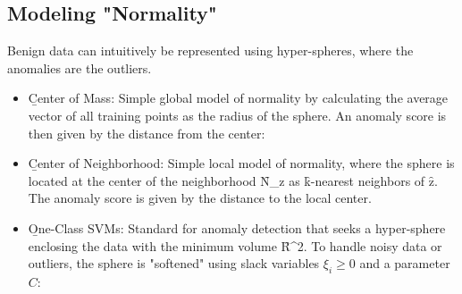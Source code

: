 \subsection{Modeling "Normality"}
Benign data can intuitively be represented using hyper-spheres, where the anomalies are the outliers.
\begin{itemize}
    \item \b{Center of Mass}: Simple global model of normality by calculating the average vector of all training points as the radius of the sphere. An anomaly score is then given by the distance from the center:
    \item \b{Center of Neighborhood}: Simple local model of normality, where the sphere is located at the center of the neighborhood \f{N_z} as \f{k}-nearest neighbors of \f{z}. The anomaly score is given by the distance to the local center.
    \item \b{One-Class SVMs}: Standard for anomaly detection that seeks a hyper-sphere enclosing the data with the minimum volume \f{R^2}.
    To handle noisy data or outliers, the sphere is "softened" using slack variables $\xi_{i}\geq 0$ and a parameter $C$:
\end{itemize}










\clearpage





